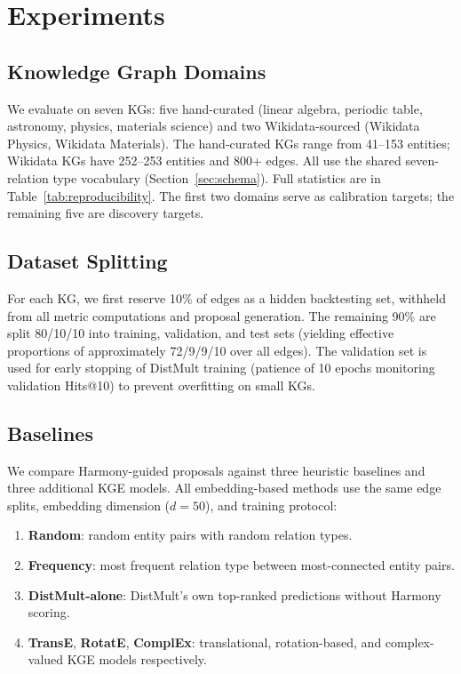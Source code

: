 \section{Experiments}\label{sec:experiments}

\subsection{Knowledge Graph Domains}

We evaluate on seven KGs: five hand-curated (linear algebra, periodic table,
astronomy, physics, materials science) and two Wikidata-sourced (Wikidata
Physics, Wikidata Materials).  The hand-curated KGs range from 41--153
entities; Wikidata KGs have 252--253 entities and 800+ edges.  All use the
shared seven-relation type vocabulary (Section~\ref{sec:schema}).  Full
statistics are in Table~\ref{tab:reproducibility}.  The first two domains
serve as calibration targets; the remaining five are discovery targets.

\subsection{Dataset Splitting}

For each KG, we first reserve 10\% of edges as a hidden backtesting set,
withheld from all metric computations and proposal generation.  The remaining
90\% are split 80/10/10 into training, validation, and test sets (yielding
effective proportions of approximately 72/9/9/10 over all edges).  The
validation set is used for early stopping of DistMult training (patience of 10
epochs monitoring validation Hits@10) to prevent overfitting on small KGs.

\subsection{Baselines}

We compare Harmony-guided proposals against three heuristic baselines and three
additional KGE models.  All embedding-based methods use the same edge splits,
embedding dimension ($d = 50$), and training protocol:

\begin{enumerate}[nosep]
  \item \textbf{Random}: random entity pairs with random relation types.
  \item \textbf{Frequency}: most frequent relation type between most-connected
    entity pairs.
  \item \textbf{DistMult-alone}: DistMult's own top-ranked predictions without
    Harmony scoring.
  \item \textbf{TransE}, \textbf{RotatE}, \textbf{ComplEx}: translational,
    rotation-based, and complex-valued KGE models respectively.
\end{enumerate}

